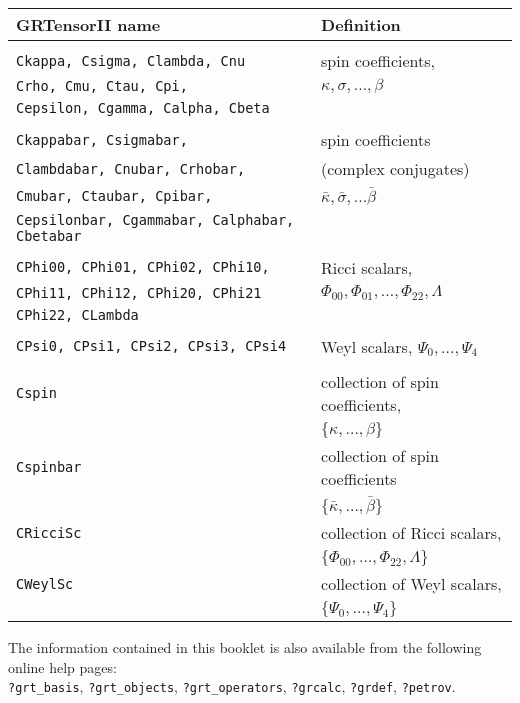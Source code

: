 \documentclass{article}
\begin{document}
\begin{longtable}[c]{p{}p{}}\hline\hline
GRTensorII name & Definition\\ \hline
& \\
\texttt{Ckappa, Csigma, Clambda, Cnu} & spin coefficients, \\
\texttt{Crho, Cmu, Ctau, Cpi,} & $\kappa, \sigma, \ldots, \beta$\\
\texttt{Cepsilon, Cgamma, Calpha, Cbeta} & \\
& \\
\texttt{Ckappabar, Csigmabar,} & spin coefficients\\
\texttt{Clambdabar, Cnubar, Crhobar,} & (complex conjugates) \\
\texttt{Cmubar, Ctaubar, Cpibar,} & $\bar{\kappa}, \bar{\sigma},
				\ldots \bar{\beta}$ \\
\texttt{Cepsilonbar, Cgammabar, Calphabar, Cbetabar} & \\
& \\
\texttt{CPhi00, CPhi01, CPhi02, CPhi10,} & Ricci scalars, \\
\texttt{CPhi11, CPhi12, CPhi20, CPhi21}  & $\Phi_{00}, \Phi_{01}, \ldots,
				  \Phi_{22}, \Lambda$ \\
\texttt{CPhi22, CLambda} & \\
& \\
\texttt{CPsi0, CPsi1, CPsi2, CPsi3, CPsi4} & Weyl scalars,
				$\Psi_0, \ldots, \Psi_4$\\
& \\
\texttt{Cspin}			& collection of spin coefficients,\\
				& $\{\kappa,\ldots,\beta\}$ \\
\texttt{Cspinbar}		& collection of spin coefficients\\
				& $\{\bar{\kappa},\ldots,\bar{\beta}\}$ \\
\texttt{CRicciSc}		& collection of Ricci scalars, \\
				& $\{\Phi_{00},\ldots,\Phi_{22},\Lambda\}$ \\
\texttt{CWeylSc}		& collection of Weyl scalars, \\
				& $\{\Psi_0,\ldots,\Psi_4\}$\\
\hline
\end{longtable}
%


\vspace*{\fill}
\large
\noindent The information contained in this booklet is also available from the
following online help pages:\\

\noindent\texttt{?grt\_basis}, \texttt{?grt\_objects},
\texttt{?grt\_operators}, \texttt{?grcalc}, \texttt{?grdef}, \texttt{?petrov}.
%
\end{document}
